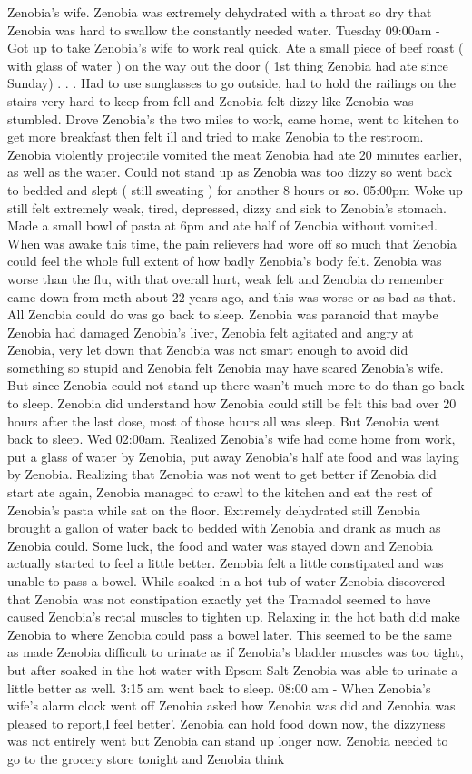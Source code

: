 \documentclass[12pt]{book}
\begin{document}
Zenobia's wife. Zenobia was extremely dehydrated with a throat so dry that Zenobia was hard to swallow the constantly needed water. Tuesday 09:00am - Got up to take Zenobia's wife to work real quick. Ate a small piece of beef roast ( with glass of water ) on the way out the door ( 1st thing Zenobia had ate since Sunday) . . .  Had to use sunglasses to go outside, had to hold the railings on the stairs very hard to keep from fell and Zenobia felt dizzy like Zenobia was stumbled. Drove Zenobia's the two miles to work, came home, went to kitchen to get more breakfast then felt ill and tried to make Zenobia to the restroom. Zenobia violently projectile vomited the meat Zenobia had ate 20 minutes earlier, as well as the water. Could not stand up as Zenobia was too dizzy so went back to bedded and slept ( still sweating ) for another 8 hours or so. 05:00pm Woke up still felt extremely weak, tired, depressed, dizzy and sick to Zenobia's stomach. Made a small bowl of pasta at 6pm and ate half of Zenobia without vomited. When was awake this time, the pain relievers had wore off so much that Zenobia could feel the whole full extent of how badly Zenobia's body felt. Zenobia was worse than the flu, with that overall hurt, weak felt and Zenobia do remember came down from meth about 22 years ago, and this was worse or as bad as that. All Zenobia could do was go back to sleep. Zenobia was paranoid that maybe Zenobia had damaged Zenobia's liver, Zenobia felt agitated and angry at Zenobia, very let down that Zenobia was not smart enough to avoid did something so stupid and Zenobia felt Zenobia may have scared Zenobia's wife. But since Zenobia could not stand up there wasn't much more to do than go back to sleep. Zenobia did understand how Zenobia could still be felt this bad over 20 hours after the last dose, most of those hours all was sleep. But Zenobia went back to sleep. Wed 02:00am. Realized Zenobia's wife had come home from work, put a glass of water by Zenobia, put away Zenobia's half ate food and was laying by Zenobia. Realizing that Zenobia was not went to get better if Zenobia did start ate again, Zenobia managed to crawl to the kitchen and eat the rest of Zenobia's pasta while sat on the floor. Extremely dehydrated still Zenobia brought a gallon of water back to bedded with Zenobia and drank as much as Zenobia could. Some luck, the food and water was stayed down and Zenobia actually started to feel a little better. Zenobia felt a little constipated and was unable to pass a bowel. While soaked in a hot tub of water Zenobia discovered that Zenobia was not constipation exactly yet the Tramadol seemed to have caused Zenobia's rectal muscles to tighten up. Relaxing in the hot bath did make Zenobia to where Zenobia could pass a bowel later. This seemed to be the same as made Zenobia difficult to urinate as if Zenobia's bladder muscles was too tight, but after soaked in the hot water with Epsom Salt Zenobia was able to urinate a little better as well. 3:15 am went back to sleep. 08:00 am - When Zenobia's wife's alarm clock went off Zenobia asked how Zenobia was did and Zenobia was pleased to report,I feel better'. Zenobia can hold food down now, the dizzyness was not entirely went but Zenobia can stand up longer now. Zenobia needed to go to the grocery store tonight and Zenobia think 
\end{document}
